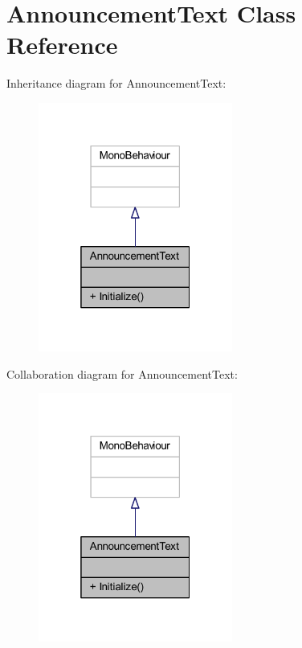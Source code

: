 \hypertarget{class_announcement_text}{}\section{Announcement\+Text Class Reference}
\label{class_announcement_text}


Inheritance diagram for Announcement\+Text\+:\nopagebreak
\begin{figure}[H]
\begin{center}
\leavevmode
\includegraphics[width=181pt]{class_announcement_text__inherit__graph}
\end{center}
\end{figure}


Collaboration diagram for Announcement\+Text\+:\nopagebreak
\begin{figure}[H]
\begin{center}
\leavevmode
\includegraphics[width=181pt]{class_announcement_text__coll__graph}
\end{center}
\end{figure}
